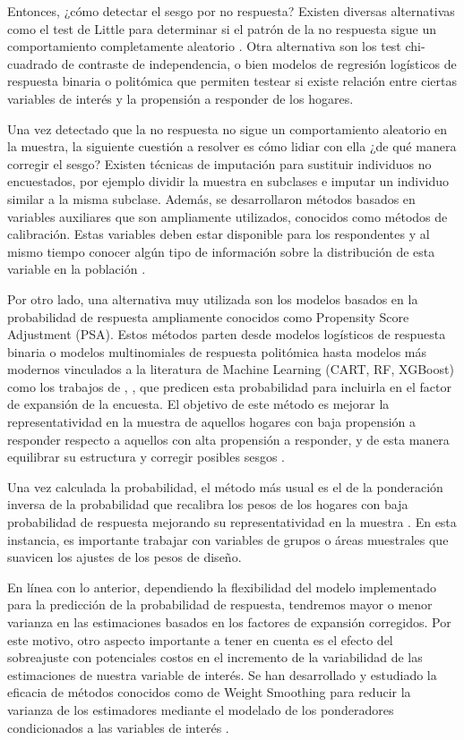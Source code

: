 \documentclass{article}
\begin{document}
Entonces, ¿cómo detectar el sesgo por no respuesta? Existen diversas alternativas como el test de Little para determinar si el patrón de la no respuesta sigue un comportamiento completamente aleatorio \cite{tesisgonz}. Otra alternativa son los test chi-cuadrado de contraste de independencia, o bien modelos de regresión logísticos de respuesta binaria o politómica que permiten testear si existe relación entre ciertas variables de interés y la propensión a responder de los hogares.

Una vez detectado que la no respuesta no sigue un comportamiento aleatorio en la muestra, la siguiente cuestión a resolver es cómo lidiar con ella ¿de qué manera corregir el sesgo? Existen técnicas de imputación para sustituir individuos no encuestados, por ejemplo dividir la muestra en subclases e imputar un individuo similar a la misma subclase. Además, se desarrollaron métodos basados en variables auxiliares que son ampliamente utilizados, conocidos como métodos de calibración. Estas variables deben estar disponible para los respondentes y al mismo tiempo conocer algún tipo de información sobre la distribución de esta variable en la población \cite{handbook} \cite{psa_calib_onlinesv}.

Por otro lado, una alternativa muy utilizada son los modelos basados en la probabilidad de respuesta ampliamente conocidos como Propensity Score Adjustment (PSA). Estos métodos parten desde modelos logísticos de respuesta binaria o modelos multinomiales de respuesta politómica  hasta modelos más modernos vinculados a la literatura de Machine Learning (CART, RF, XGBoost) como los trabajos de \cite{methodsml}, \cite{methodsml_medicine}, \cite{methodsml_3} que predicen esta probabilidad para incluirla en el factor de expansión de la encuesta. El objetivo de este método es mejorar la representatividad en la muestra de aquellos hogares con baja propensión a responder respecto a aquellos con alta propensión a responder, y de esta manera equilibrar su estructura y corregir posibles sesgos \cite{handbook}. 

Una vez calculada la probabilidad, el método más usual es el de la ponderación inversa de la probabilidad que recalibra los pesos de los hogares con baja probabilidad de respuesta mejorando su representatividad en la muestra \cite{methodsml}. En esta instancia, es importante trabajar con variables de grupos o áreas muestrales que suavicen los ajustes de los pesos de diseño.

En línea con lo anterior, dependiendo la flexibilidad del modelo implementado para la predicción de la probabilidad de respuesta, tendremos mayor o menor varianza en las estimaciones basados en los factores de expansión corregidos. Por este motivo, otro aspecto importante a tener en cuenta es el efecto del sobreajuste con potenciales costos en el incremento de la variabilidad de las estimaciones de nuestra variable de interés. Se han desarrollado y estudiado la eficacia de métodos conocidos como de Weight Smoothing para reducir la varianza de los estimadores mediante el modelado de los ponderadores condicionados a las variables de interés \cite{wsmooth}.
\end{document}
